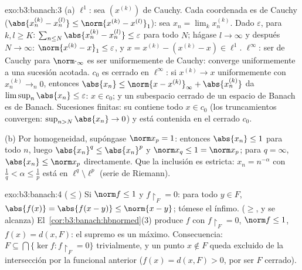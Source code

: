 \begin{solution}{exo:b3:banach:3}
(a) $\ell^1$: sea $(x^{(k)})$ de Cauchy. Cada coordenada es de Cauchy
($\abs{x^{(k)}_n - x^{(l)}_n} \leq \norm{x^{(k)} -
x^{(l)}}_1$): sea $x_n = \lim_kx^{(k)}_n$. Dado $\varepsilon$, para
$k, l \geq K$: $\sum_{n \leq N}\abs{x^{(k)}_n - x^{(l)}_n}
\leq \varepsilon$ para todo $N$; hágase $l \to \infty$ y después $N \to
\infty$: $\norm{x^{(k)} - x}_1 \leq \varepsilon$, y $x =
x^{(k)} - (x^{(k)} - x) \in \ell^1$. $\ell^\infty$: ser de Cauchy para
$\norm\cdot_\infty$ es ser uniformemente de Cauchy: converge
uniformemente a una sucesión acotada. $c_0$ es cerrado en $\ell^\infty$:
si $x^{(k)} \to x$ uniformemente con $x^{(k)}_n \to_n 0$, entonces
$\abs{x_n} \leq \norm{x - x^{(k)}}_\infty + \abs{x^{(k)}_n}$
da $\limsup_n\abs{x_n} \leq \varepsilon$: $x \in c_0$; y un subespacio
cerrado de un espacio de Banach es de Banach. Sucesiones finitas: su
 contiene todo $x \in c_0$
(los truncamientos convergen: $\sup_{n>N}\abs{x_n} \to 0$) y está
contenida en el cerrado
$c_0$.

(b) Por homogeneidad, supóngase $\norm x_p = 1$: entonces
$\abs{x_n} \leq
1$ para todo $n$, luego $\abs{x_n}^q \leq \abs{x_n}^p$ y $\norm
x_q \leq 1 = \norm x_p$; para $q = \infty$, $\abs{x_n} \leq
\norm x_p$ directamente. Que la inclusión es estricta:
$x_n = n^{-\alpha}$ con $\frac1q < \alpha \leq \frac1p$ está en
$\ell^q \setminus
\ell^p$ (serie de Riemann).
\end{solution}

\begin{solution}{exo:b3:banach:4}
($\leq$) Si $\norm f \leq 1$ y $f\restriction_F = 0$: para todo
$y \in F$, $\abs{f(x)} = \abs{f(x - y)} \leq \norm{x -
y}$; tómese el ínfimo. ($\geq$, y se alcanza)
El~\cref{cor:b3:banach:hbnormed}(3) produce $f$ con
$f\restriction_F = 0$, $\norm f \leq 1$, $f(x) = d(x, F)$: el supremo es
un máximo. Consecuencia: $F \subseteq \bigcap\{\ker
f : f\restriction_F = 0\}$ trivialmente, y un punto $x \notin F$ queda
excluido de la intersección por la funcional anterior
($f(x) = d(x,F) > 0$, por ser $F$ cerrado).
\end{solution}

